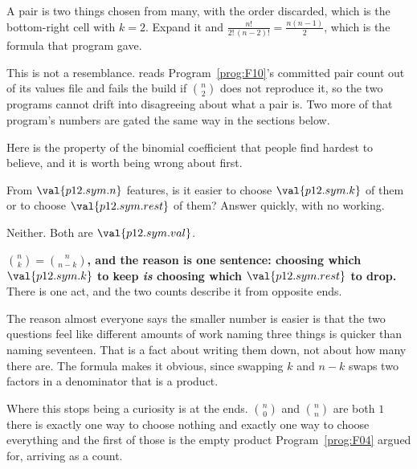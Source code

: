 \begin{fr}
A pair is two things chosen from many, with the order discarded, which is the
bottom-right cell with $k = 2$. Expand it and
$\frac{n!}{2!\,(n-2)!} = \frac{n(n-1)}{2}$, which is the formula that program
gave.

\begin{note}
This is not a resemblance.  reads
Program~\ref{prog:F10}'s committed pair count out of its values file and fails
the build if $\binom{n}{2}$ does not reproduce it, so the two programs cannot
drift into disagreeing about what a pair is. Two more of that program's
numbers are gated the same way in the sections below.
\end{note}
\end{fr}

\begin{fr}
Here is the property of the binomial coefficient that people find hardest to
believe, and it is worth being wrong about first.

From $\val{p12.sym.n}$ features, is it easier to choose $\val{p12.sym.k}$ of
them or to choose $\val{p12.sym.rest}$ of them? Answer quickly, with no
working.
\nextframe
\end{fr}

\begin{fr}
\begin{ansblock}
Neither. Both are $\val{p12.sym.val}$.
\end{ansblock}

\begin{trapbox}
\textbf{$\binom{n}{k} = \binom{n}{n-k}$, and the reason is one sentence:
choosing which $\val{p12.sym.k}$ to keep \emph{is} choosing which
$\val{p12.sym.rest}$ to drop.} There is one act, and the two counts describe
it from opposite ends.

The reason almost everyone says the smaller number is easier is that the two
questions feel like different amounts of work \dash{} naming three things is
quicker than naming seventeen. That is a fact about writing them down, not
about how many there are. The formula makes it obvious, since swapping $k$ and
$n-k$ swaps two factors in a denominator that is a product.

Where this stops being a curiosity is at the ends. $\binom{n}{0}$ and
$\binom{n}{n}$ are both $1$ \dash{} there is exactly one way to choose nothing
and exactly one way to choose everything \dash{} and the first of those is the
empty product Program~\ref{prog:F04} argued for, arriving as a count.
\end{trapbox}
\end{fr}


